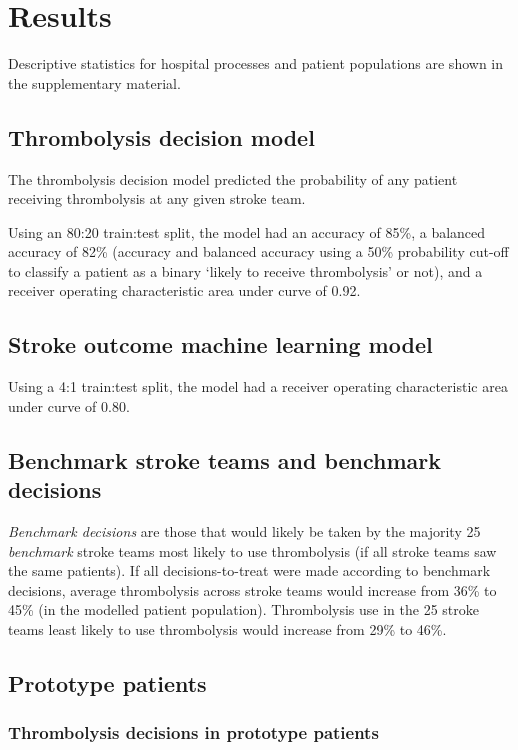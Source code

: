 \section{Results}

Descriptive statistics for hospital processes and patient populations are shown in the supplementary material.

\subsection{Thrombolysis decision model}

The thrombolysis decision model predicted the probability of any patient receiving thrombolysis at any given stroke team.

Using an 80:20 train:test split, the model had an accuracy of 85\%, a balanced accuracy of 82\% (accuracy and balanced accuracy using a 50\% probability cut-off to classify a patient as a binary `likely to receive thrombolysis' or not), and a receiver operating characteristic area under curve of 0.92.


\subsection{Stroke outcome machine learning model}

Using a 4:1 train:test split, the model had a receiver operating characteristic area under curve of 0.80.

\subsection{Benchmark stroke teams and benchmark decisions}

\textit{Benchmark decisions} are those that would likely be taken by the majority 25 \textit{benchmark} stroke teams most likely to use thrombolysis (if all stroke teams saw the same patients). If all decisions-to-treat were made according to benchmark decisions, average thrombolysis across stroke teams would increase from 36\% to 45\% (in the modelled patient population). Thrombolysis use in the 25 stroke teams least likely to use thrombolysis would increase from 29\% to 46\%.

\subsection{Prototype patients}

\subsubsection{Thrombolysis decisions in prototype patients}

